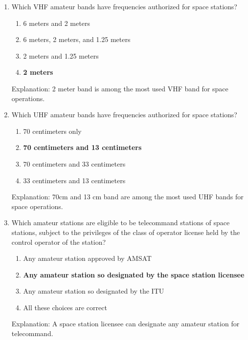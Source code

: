 \begin{enumerate}
      \item Which VHF amateur bands have frequencies authorized for space stations?
        \begin{enumerate}
        \item 6 meters and 2 meters
       \item  6 meters, 2 meters, and 1.25 meters
         \item  2 meters and 1.25 meters
     \item \textbf {2 meters}
        \end{enumerate}
      \textcolor{myred}{Explanation:}
    2 meter band is among the most used VHF band for space operations.
         
    \item Which UHF amateur bands have frequencies authorized for space stations?
       \begin{enumerate}
      \item 70 centimeters only
       \item \textbf {70 centimeters and 13 centimeters}
    \item  70 centimeters and 33 centimeters
       \item  33 centimeters and 13 centimeters
     \end{enumerate}
     \textcolor{myred}{Explanation:}
        70cm and 13 cm band are among the most used UHF bands for space operations.
       
      \item Which amateur stations are eligible to be telecommand stations of space stations, subject to the privileges of the class of operator license held by the control operator of the station?
    \begin{enumerate}
        \item Any amateur station approved by AMSAT
        \item \textbf {Any amateur station so designated by the space station licensee}
       \item  Any amateur station so designated by the ITU
        \item  All these choices are correct
    \end{enumerate}
        \textcolor{myred}{Explanation:}
       A space station licensee can designate any amateur station for telecommand.
   

\end{enumerate}
